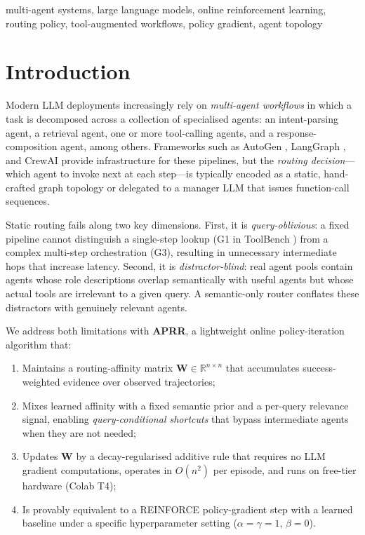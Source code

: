 \documentclass[journal,twocolumn,letterpaper]{IEEEtran}
\newcommand{\APRR}{\textsc{APRR}}
\newcommand{\WW}{\mathbf{W}}
\newcommand{\RR}{\mathbb{R}}
\begin{document}
\begin{IEEEkeywords}
multi-agent systems, large language models, online reinforcement learning,
routing policy, tool-augmented workflows, policy gradient, agent topology
\end{IEEEkeywords}

\section{Introduction}
\label{sec:intro}

Modern LLM deployments increasingly rely on \emph{multi-agent workflows}
\cite{wu2023autogen,chase2023langchain,joao2023crewai} in which a task is
decomposed across a collection of specialised agents: an intent-parsing agent,
a retrieval agent, one or more tool-calling agents, and a response-composition
agent, among others.  Frameworks such as AutoGen \cite{wu2023autogen},
LangGraph \cite{chase2023langchain}, and CrewAI \cite{joao2023crewai} provide
infrastructure for these pipelines, but the \emph{routing decision}---which
agent to invoke next at each step---is typically encoded as a static,
hand-crafted graph topology or delegated to a manager LLM that issues
function-call sequences.

Static routing fails along two key dimensions.  First, it is
\emph{query-oblivious}: a fixed pipeline cannot distinguish a single-step
lookup (G1 in ToolBench \cite{qin2024toolllm}) from a complex multi-step
orchestration (G3), resulting in unnecessary intermediate hops that increase
latency.  Second, it is \emph{distractor-blind}: real agent pools contain
agents whose role descriptions overlap semantically with useful agents but
whose actual tools are irrelevant to a given query.  A semantic-only router
\cite{ong2024routellm} conflates these distractors with genuinely relevant
agents.

We address both limitations with \textbf{\APRR{}}, a lightweight online
policy-iteration algorithm that:
\begin{enumerate}
  \item Maintains a routing-affinity matrix $\WW\in\RR^{n\times n}$ that
        accumulates success-weighted evidence over observed trajectories;
  \item Mixes learned affinity with a fixed semantic prior and a
        per-query relevance signal, enabling \emph{query-conditional shortcuts}
        that bypass intermediate agents when they are not needed;
  \item Updates $\WW$ by a decay-regularised additive rule that requires no
        LLM gradient computations, operates in $O(n^2)$ per episode, and runs
        on free-tier hardware (Colab T4);
  \item Is provably equivalent to a REINFORCE policy-gradient step
        \cite{williams1992reinforce} with a learned baseline under a specific
        hyperparameter setting ($\alpha{=}\gamma{=}1$, $\beta{=}0$).
\end{enumerate}
\end{document}
